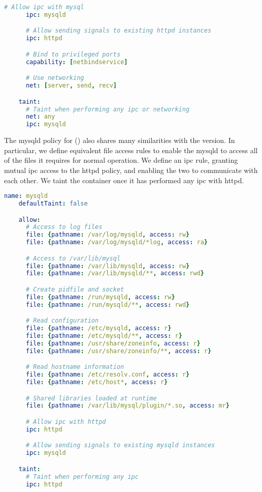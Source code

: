 \begin{lstlisting}[language=yaml, gobble=4, float=false, caption={[A \bpfcontain{} policy for Apache httpd]
  A \bpfcontain{} policy for Apache httpd.
  %\todo{Describe this}
}, label={lst:bpfcontain-apache}]
      # Allow ipc with mysql
      ipc: mysqld

      # Allow sending signals to existing httpd instances
      ipc: httpd

      # Bind to privileged ports
      capability: [netbindservice]

      # Use networking
      net: [server, send, recv]

    taint:
      # Taint when performing any ipc or networking
      net: any
      ipc: mysqld
\end{lstlisting}

The mysqld policy for \bpfcontain{} () also shares many
similarities with the \bpfbox{} version.  In particular, we define equivalent file access
rules to enable the mysqld to access all of the files it requires for normal operation. We
define an \gls{ipc} rule, granting mutual \gls{ipc} access to the httpd policy, and
enabling the two to communicate with each other. We taint the container once it has
performed any \gls{ipc} with httpd.

\begin{lstlisting}[language=yaml, gobble=4, float=false, caption={[A \bpfcontain{} policy for MySQL]
  A \bpfcontain{} policy for MySQL.
  %\todo{Describe this}
}, label={lst:bpfcontain-mysql}]
    name: mysqld
    defaultTaint: false

    allow:
      # Access to log files
      file: {pathname: /var/log/mysqld, access: rw}
      file: {pathname: /var/log/mysqld/*log, access: ra}

      # Access to /var/lib/mysql
      file: {pathname: /var/lib/mysqld, access: rw}
      file: {pathname: /var/lib/mysqld/**, access: rwd}

      # Create pidfile and socket
      file: {pathname: /run/mysqld, access: rw}
      file: {pathname: /run/mysqld/**, access: rwd}

      # Read configuration
      file: {pathname: /etc/mysqld, access: r}
      file: {pathname: /etc/mysqld/**, access: r}
      file: {pathname: /usr/share/zoneinfo, access: r}
      file: {pathname: /usr/share/zoneinfo/**, access: r}

      # Read hostname information
      file: {pathname: /etc/resolv.conf, access: r}
      file: {pathname: /etc/host*, access: r}

      # Shared libraries loaded at runtime
      file: {pathname: /var/lib/mysql/plugin/*.so, access: mr}

      # Allow ipc with httpd
      ipc: httpd

      # Allow sending signals to existing mysqld instances
      ipc: mysqld

    taint:
      # Taint when performing any ipc
      ipc: httpd
\end{lstlisting}


